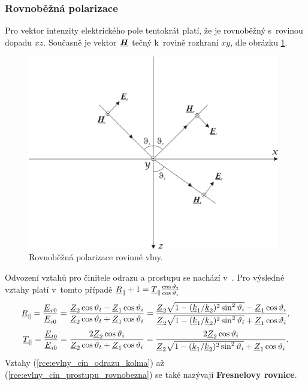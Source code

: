 \subsubsection*{Rovnoběžná polarizace}
Pro vektor intenzity elektrického pole tentokrát platí, že je rovnoběžný s~rovinou dopadu $xz$. Současně je vektor $\mbox{\underline{\boldmath$H$}}$ tečný k~rovině rozhraní $xy$, dle obrázku \ref{obr:evlny_rovnobezna_polarizace}.
\begin{figure}[!h]
	\centering
	\includegraphics[width=11cm]{evlny_rovnobezna_polarizace.png}
	\caption{Rovnoběžná polarizace rovinné vlny. \cite{emp}}
	\label{obr:evlny_rovnobezna_polarizace}
\end{figure}
Odvození vztahů pro činitele odrazu a prostupu se nachází v~\cite[str. 95]{emp}. Pro výsledné vztahy platí v~tomto případě ${\underline{R}}_{\parallel} + 1 = {\underline{T}}_{\parallel}\frac{\cos\vartheta_{t}}{\cos\vartheta_{i}}$
\begin{equation}
	{\underline{R}}_{\parallel} = \frac{{\underline{E}}_{r0}}{{\underline{E}}_{i0}} = \frac{{\underline{Z}}_{2}\cos\vartheta_{t}-{\underline{Z}}_{1}\cos\vartheta_{i}}{{\underline{Z}}_{2}\cos\vartheta_{t}+{\underline{Z}}_{1}\cos\vartheta_{i}} = \frac{{\underline{Z}}_{2}\sqrt{1-({\underline{k}}_{1}/{\underline{k}}_{2})^{2}\sin^{2}\vartheta_{i}}-{\underline{Z}}_{1}\cos\vartheta_{i}}{{\underline{Z}}_{2}\sqrt{1-({\underline{k}}_{1}/{\underline{k}}_{2})^{2}\sin^{2}\vartheta_{i}}+{\underline{Z}}_{1}\cos\vartheta_{i}},
	\label{rce:evlny_cin_odrazu_rovnobezna}
\end{equation}
\begin{equation}
	{\underline{T}}_{\parallel} = \frac{{\underline{E}}_{t0}}{{\underline{E}}_{i0}} = \frac{2{\underline{Z}}_{2}\cos\vartheta_{i}}{{\underline{Z}}_{2}\cos\vartheta_{t}+{\underline{Z}}_{1}\cos\vartheta_{i}} = \frac{2{\underline{Z}}_{2}\cos\vartheta_{i}}{{\underline{Z}}_{2}\sqrt{1-({\underline{k}}_{1}/{\underline{k}}_{2})^{2}\sin^{2}\vartheta_{i}}+{\underline{Z}}_{1}\cos\vartheta_{i}}.
	\label{rce:evlny_cin_prostupu_rovnobezna}
\end{equation}
Vztahy (\ref{rce:evlny_cin_odrazu_kolma}) až (\ref{rce:evlny_cin_prostupu_rovnobezna}) se také nazývají {\bf Fresnelovy rovnice}.


